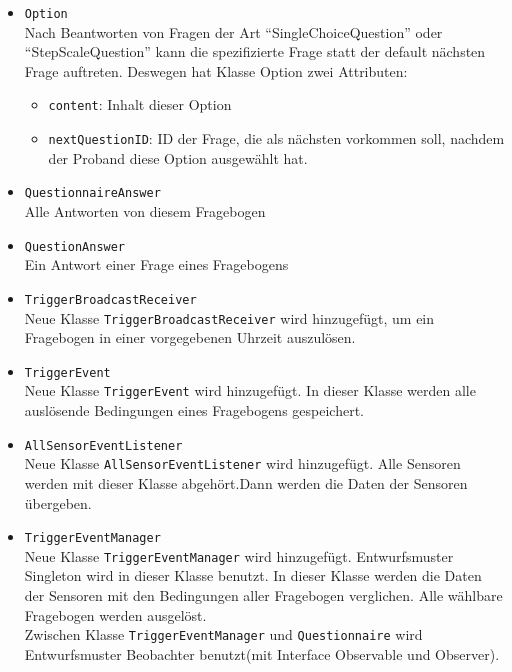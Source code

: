 \documentclass[a4paper]{scrreprt}
\begin{document}
                   \begin{itemize}
                       \item \texttt{Option} \\ Nach Beantworten von Fragen der Art ``SingleChoiceQuestion'' oder ``StepScaleQuestion'' kann die spezifizierte Frage statt der default nächsten Frage auftreten. Deswegen hat Klasse Option zwei Attributen:
                                \begin{itemize}
                                    \item \texttt{content}: Inhalt dieser Option
                                    \item \texttt{nextQuestionID}: ID der Frage, die als nächsten vorkommen soll, nachdem der Proband diese Option ausgewählt hat.
                                \end{itemize}
                        \item \texttt{QuestionnaireAnswer} \\ Alle Antworten von diesem Fragebogen
                        \item \texttt{QuestionAnswer} \\ Ein Antwort einer Frage eines Fragebogens
                       \item \texttt{TriggerBroadcastReceiver} \\ Neue Klasse \texttt{TriggerBroadcastReceiver} wird hinzugefügt, um ein Fragebogen in einer vorgegebenen Uhrzeit auszulösen.
                       \item \texttt{TriggerEvent} \\ Neue Klasse \texttt{TriggerEvent} wird hinzugefügt. In dieser Klasse werden alle auslösende Bedingungen eines Fragebogens gespeichert.
                       \item \texttt{AllSensorEventListener} \\ Neue Klasse \texttt{AllSensorEventListener} wird hinzugefügt. Alle Sensoren werden mit dieser Klasse abgehört.Dann werden die Daten der Sensoren übergeben.
                       \item \texttt{TriggerEventManager} \\ 
                       Neue Klasse \texttt{TriggerEventManager} wird hinzugefügt. Entwurfsmuster Singleton wird in dieser Klasse benutzt. In dieser Klasse werden die Daten der Sensoren mit den Bedingungen aller Fragebogen verglichen. Alle wählbare Fragebogen werden ausgelöst.\\
                       Zwischen Klasse \texttt{TriggerEventManager} und \texttt{Questionnaire} wird Entwurfsmuster Beobachter benutzt(mit Interface Observable und Observer).
                   \end{itemize}
\end{document}
